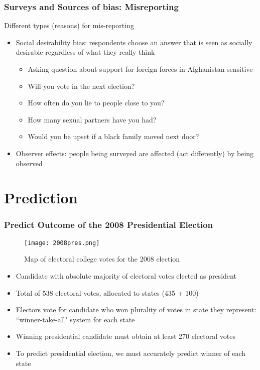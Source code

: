 \documentclass[handout]{beamer}
\begin{document}
\begin{frame}
 \frametitle{Surveys and Sources of bias: Misreporting}
 Different types (reasons) for mis-reporting
 \begin{itemize}[<+->]
   \item Social desirability bias: respondents choose an answer that is seen as socially desirable regardless of what they really think
     \begin{itemize}
       \item Asking question about support for foreign forces in Afghanistan sensitive
       \item Will you vote in the next election?
       \item How often do you lie to people close to you?
       \item How many sexual partners have you had?
       \item Would you be upset if a black family moved next door?
     \end{itemize}
   \item Observer effects: people being surveyed are affected (act differently) by being observed
 \end{itemize}
\end{frame}

\section{Prediction}

\begin{frame}
 \frametitle<+->{Predict Outcome of the 2008 Presidential Election}
 \begin{minipage}{.4\linewidth}
 \begin{figure}
 \caption{Map of electoral college votes for the 2008 election}
 \texttt{[image: 2008pres.png]}
 \end{figure}
 \end{minipage}\hfill
 \begin{minipage}{.58\linewidth}
 \begin{itemize}[<+->]
   \item Candidate with absolute majority of electoral votes elected as president
   \item Total of 538 electoral votes, allocated to states (435 + 100)
   \item Electors vote for candidate who won plurality of votes in state they represent: ``winner-take-all" system for each state
   \item Winning presidential candidate must obtain at least 270 electoral votes
   \item To predict presidential election, we must accurately predict winner of each state
 \end{itemize}
 \end{minipage}
\end{frame}
\end{document}
